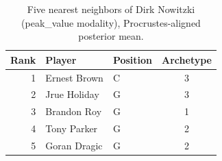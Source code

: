 \begin{table}[htbp]
  \centering\small
  \begin{tabular}{rllc}
    \toprule
    Rank & Player & Position & Archetype \\
    \midrule
    1 & Ernest Brown & C & 3 \\
    2 & Jrue Holiday & G & 3 \\
    3 & Brandon Roy & G & 1 \\
    4 & Tony Parker & G & 2 \\
    5 & Goran Dragic & G & 2 \\
    \bottomrule
  \end{tabular}
  \caption{Five nearest neighbors of Dirk Nowitzki (peak_value modality), Procrustes-aligned posterior mean.}
  \label{tab:Dirk_Nowitzki_neighbors_peak_value}
\end{table}

